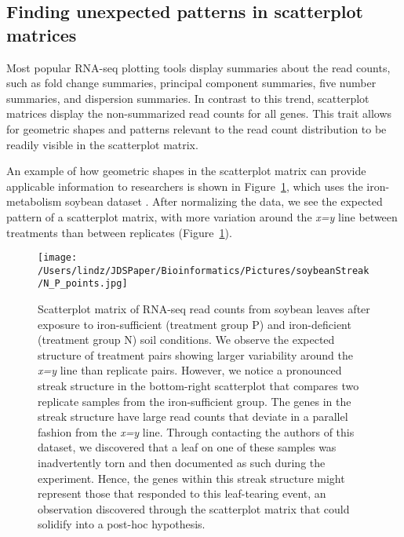 \documentclass{bioinfo}
\begin{document}
\subsection{Finding unexpected patterns in scatterplot matrices}

Most popular RNA-seq plotting tools display summaries about the read counts, such as fold change summaries, principal component summaries, five number summaries, and dispersion summaries. In contrast to this trend, scatterplot matrices display the non-summarized read counts for all genes. This trait allows for geometric shapes and patterns relevant to the read count distribution to be readily visible in the scatterplot matrix.

An example of how geometric shapes in the scatterplot matrix can provide applicable information to researchers is shown in Figure~\ref{structure}, which uses the iron-metabolism soybean dataset \citep{Lauter}. After normalizing the data, we see the expected pattern of a scatterplot matrix, with more variation around the \textit{x=y} line between treatments than between replicates (Figure~\ref{structure}). 

\begin{figure}[!tpb]
\centerline{\texttt{[image: /Users/lindz/JDSPaper/Bioinformatics/Pictures/soybeanStreak/N\_P\_points.jpg]}}
\caption{Scatterplot matrix of RNA-seq read counts from soybean leaves after exposure to iron-sufficient (treatment group P) and iron-deficient (treatment group N) soil conditions. We observe the expected structure of treatment pairs showing larger variability around the \textit{x=y} line than replicate pairs. However, we notice a pronounced streak structure in the bottom-right scatterplot that compares two replicate samples from the iron-sufficient group. The genes in the streak structure have large read counts that deviate in a parallel fashion from the \textit{x=y} line. Through contacting the authors of this dataset, we discovered that a leaf on one of these samples was inadvertently torn and then documented as such during the experiment. Hence, the genes within this streak structure might represent those that responded to this leaf-tearing event, an observation discovered through the scatterplot matrix that could solidify into a post-hoc hypothesis.
\label{structure}}
\end{figure}
\end{document}
